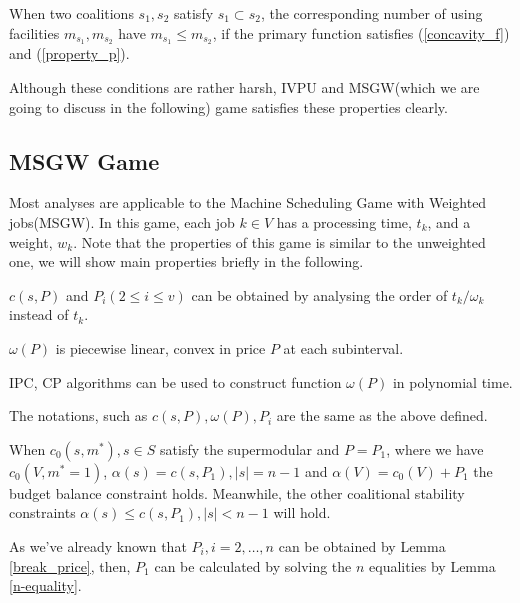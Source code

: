 \begin{thm}\label{machine_num}
When two coalitions $s_1,s_2$ satisfy $s_1 \subset s_2$, the corresponding number of using facilities $ m_{s_1}, m_{s_2}$ have $m_{s_1} \leq m_{s_2}$, if the primary function satisfies  (\ref{concavity_f}) and (\ref{property_p}).
\end{thm}

Although these conditions are rather harsh, IVPU and MSGW(which we are going to discuss in the following) game satisfies these properties clearly.

\subsection*{MSGW Game}
Most analyses are applicable to the Machine Scheduling Game with Weighted jobs(MSGW).
In this game, each job $k \in V$ has a processing time, $t_k$, and a weight, $w_k$.
Note that the properties of this game is similar to the unweighted one, we will show main properties briefly in the following.

\begin{corollary} \label{cor-1}
$c(s,P)$ and $P_i(2 \leq i \leq v)$ can be obtained by analysing the order of $t_k/\omega_k$ instead of $t_k$.
\end{corollary}

\begin{corollary} \label{cor-2}
  $\omega(P)$ is piecewise linear, convex in price $P$ at each subinterval.
\end{corollary}

\begin{corollary} \label{cor-3}
  IPC, CP algorithms can be used to construct function $\omega(P)$ in polynomial time.
\end{corollary}

The notations, such as $c(s,P), \omega(P), P_i$ are the same as the above defined.

\begin{lem}\label{n-equality}
When $c_0(s,m^*), s \in S$ satisfy the supermodular and $P=P_1$, where we have $c_0(V,m^* = 1)$, $\alpha(s)=c(s, P_1), \left| s \right|= n-1$ and $\alpha(V)=c_0(V)+P_1$ the budget balance constraint holds. Meanwhile, the other coalitional stability constraints $\alpha(s) \leq c(s, P_1), \left| s \right| < n-1$ will hold.
\end{lem}

As we've already known that $P_i, i = 2,\ldots,n$ can be obtained by Lemma \ref{break_price}, then, $P_1$ can be calculated by solving the $n$ equalities by Lemma \ref{n-equality}.

